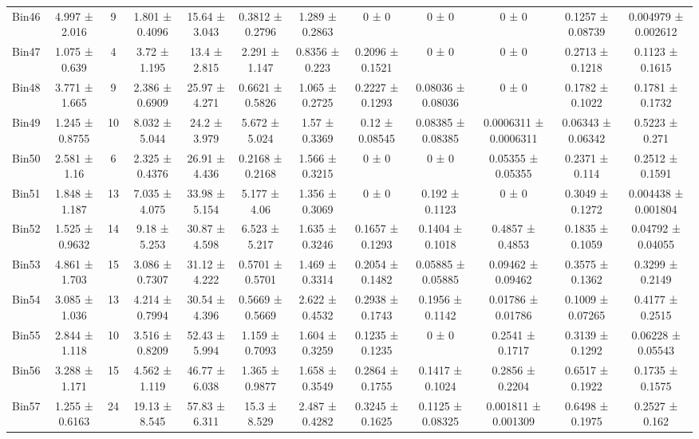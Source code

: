 \begin{tabular}{@{\extracolsep{4pt}}lccccccccccc@{}}
     Bin46 & 4.997 ± 2.016 & 9 & 1.801 ± 0.4096 & 15.64 ± 3.043 & 0.3812 ± 0.2796 & 1.289 ± 0.2863 & 0 ± 0 & 0 ± 0 & 0 ± 0 & 0.1257 ± 0.08739 & 0.004979 ± 0.002612 \\ 
     Bin47 & 1.075 ± 0.639 & 4 & 3.72 ± 1.195 & 13.4 ± 2.815 & 2.291 ± 1.147 & 0.8356 ± 0.223 & 0.2096 ± 0.1521 & 0 ± 0 & 0 ± 0 & 0.2713 ± 0.1218 & 0.1123 ± 0.1615 \\ 
     Bin48 & 3.771 ± 1.665 & 9 & 2.386 ± 0.6909 & 25.97 ± 4.271 & 0.6621 ± 0.5826 & 1.065 ± 0.2725 & 0.2227 ± 0.1293 & 0.08036 ± 0.08036 & 0 ± 0 & 0.1782 ± 0.1022 & 0.1781 ± 0.1732 \\ 
     Bin49 & 1.245 ± 0.8755 & 10 & 8.032 ± 5.044 & 24.2 ± 3.979 & 5.672 ± 5.024 & 1.57 ± 0.3369 & 0.12 ± 0.08545 & 0.08385 ± 0.08385 & 0.0006311 ± 0.0006311 & 0.06343 ± 0.06342 & 0.5223 ± 0.271 \\ 
     Bin50 & 2.581 ± 1.16 & 6 & 2.325 ± 0.4376 & 26.91 ± 4.436 & 0.2168 ± 0.2168 & 1.566 ± 0.3215 & 0 ± 0 & 0 ± 0 & 0.05355 ± 0.05355 & 0.2371 ± 0.114 & 0.2512 ± 0.1591 \\ 
     Bin51 & 1.848 ± 1.187 & 13 & 7.035 ± 4.075 & 33.98 ± 5.154 & 5.177 ± 4.06 & 1.356 ± 0.3069 & 0 ± 0 & 0.192 ± 0.1123 & 0 ± 0 & 0.3049 ± 0.1272 & 0.004438 ± 0.001804 \\ 
     Bin52 & 1.525 ± 0.9632 & 14 & 9.18 ± 5.253 & 30.87 ± 4.598 & 6.523 ± 5.217 & 1.635 ± 0.3246 & 0.1657 ± 0.1293 & 0.1404 ± 0.1018 & 0.4857 ± 0.4853 & 0.1835 ± 0.1059 & 0.04792 ± 0.04055 \\ 
     Bin53 & 4.861 ± 1.703 & 15 & 3.086 ± 0.7307 & 31.12 ± 4.222 & 0.5701 ± 0.5701 & 1.469 ± 0.3314 & 0.2054 ± 0.1482 & 0.05885 ± 0.05885 & 0.09462 ± 0.09462 & 0.3575 ± 0.1362 & 0.3299 ± 0.2149 \\ 
     Bin54 & 3.085 ± 1.036 & 13 & 4.214 ± 0.7994 & 30.54 ± 4.396 & 0.5669 ± 0.5669 & 2.622 ± 0.4532 & 0.2938 ± 0.1743 & 0.1956 ± 0.1142 & 0.01786 ± 0.01786 & 0.1009 ± 0.07265 & 0.4177 ± 0.2515 \\ 
     Bin55 & 2.844 ± 1.118 & 10 & 3.516 ± 0.8209 & 52.43 ± 5.994 & 1.159 ± 0.7093 & 1.604 ± 0.3259 & 0.1235 ± 0.1235 & 0 ± 0 & 0.2541 ± 0.1717 & 0.3139 ± 0.1292 & 0.06228 ± 0.05543 \\ 
     Bin56 & 3.288 ± 1.171 & 15 & 4.562 ± 1.119 & 46.77 ± 6.038 & 1.365 ± 0.9877 & 1.658 ± 0.3549 & 0.2864 ± 0.1755 & 0.1417 ± 0.1024 & 0.2856 ± 0.2204 & 0.6517 ± 0.1922 & 0.1735 ± 0.1575 \\ 
     Bin57 & 1.255 ± 0.6163 & 24 & 19.13 ± 8.545 & 57.83 ± 6.311 & 15.3 ± 8.529 & 2.487 ± 0.4282 & 0.3245 ± 0.1625 & 0.1125 ± 0.08325 & 0.001811 ± 0.001309 & 0.6498 ± 0.1975 & 0.2527 ± 0.162 \\ 

\end{tabular}
